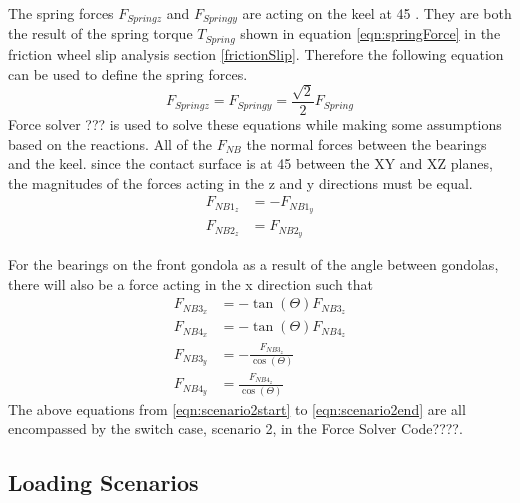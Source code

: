 \documentclass[../main.tex]{subfiles}
\begin{document}
The spring forces $F_{Springz}$ and $F_{Springy}$ are acting on the keel at 45 \textdegree. They are both the result of the spring torque $T_{Spring}$ shown in equation \ref{eqn:springForce} in the friction wheel slip analysis section \ref{frictionSlip}. Therefore the following equation can be used to define the spring forces. 
\begin{equation}
F_{Springz} = F_{Springy} = \frac{\sqrt{2}}{2} F_{Spring}
\end{equation}
Force solver ??? is used to solve these equations while making some assumptions based on the reactions. All of the $F_{NB}$ the normal forces between the bearings and the keel. since the contact surface is at 45 \textdegree  between the XY and XZ planes, the magnitudes of the forces acting in the z and y directions must be equal. 
\begin{align}
\label{eqn:scenario2start}
F_{NB1_{z}} &= - F_{NB1_{y}} \\
F_{NB2_{z}} &= F_{NB2_{y}} 
\end{align}

For the bearings on the front gondola as a result of the  angle between gondolas, there will also be a force acting in the x direction such that 
\begin{align}
F_{NB3_{x}} &= -\tan(\Theta) F_{NB3_{z}}\\ 
F_{NB4_{x}} &= -\tan(\Theta) F_{NB4_{z}}\\
F_{NB3_{y}} &= -\frac{F_{NB3_{z}}}{\cos(\Theta)} \\ F_{NB4_{y}} &= \frac{F_{NB4_{z}}}{\cos(\Theta)} \label{eqn:scenario2end}
\end{align}
The above equations from \ref{eqn:scenario2start} to \ref{eqn:scenario2end} are all encompassed by the switch case, scenario 2, in the Force Solver Code????. 


\subsection{Loading Scenarios} \label{loadingScenarios}
\end{document}
